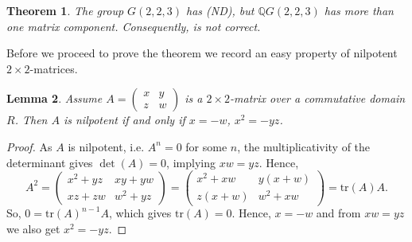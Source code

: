 \documentclass[a4paper,10pt]{amsart}
\newtheorem{lemma}{Lemma}[section]
\newtheorem{theorem}[lemma]{Theorem}
\theoremstyle{definition}
\theoremstyle{remark}
\begin{document}
\begin{theorem}\label{th:counterex}
The group $G(2,2,3)$ has (ND), but $\mathbb{Q}G(2,2,3)$ has more than one matrix component. Consequently,  is not correct.
\end{theorem}

Before we proceed to prove the theorem we record an easy property of nilpotent $2\times 2$-matrices.

\begin{lemma}\label{lem:FormulaNilpotent2x2Matrices}
Assume $A = \begin{pmatrix} x & y \\ z & w \end{pmatrix}$ is a $2\times 2$-matrix over a commutative domain $R$. Then $A$ is nilpotent if and only if $x = -w$, $x^2 = -yz$. 
\end{lemma}
\begin{proof}
As $A$ is nilpotent, i.e. $A^n=0$ for some $n$, the multiplicativity of the determinant gives $\det(A)=0$, implying $xw = yz$. 
Hence,
\[A^2 = \begin{pmatrix} x^2 + yz & xy + yw \\ xz + zw & w^2 + yz \end{pmatrix} = \begin{pmatrix} x^2 + xw & y(x + w) \\ z(x + w) & w^2 + xw \end{pmatrix} = \text{tr}(A)A. \]
So, $0 = \text{tr}(A)^{n-1}A$, which gives $\text{tr}(A) = 0$. Hence, $x=-w$ and from $xw=yz$ we also get $x^2=-yz$.
\end{proof}
\end{document}
